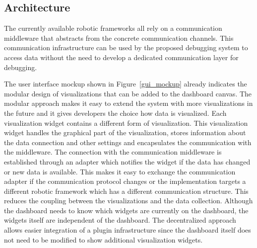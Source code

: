 \subsection{Architecture}
The currently available robotic frameworks all rely on a communication middleware that abstracts from the concrete communication channels. This communication infrastructure can be used by the proposed debugging system to access data without the need to develop a dedicated communication layer for debugging.

The user interface mockup shown in Figure~\ref{gui_mockup} already indicates the modular design of visualizations that can be added to the dashboard canvas. The modular approach makes it easy to extend the system with more visualizations in the future and it gives developers the choice how data is visualized. Each visualization widget contains a different form of visualization. This visualization widget handles the graphical part of the visualization, stores information about the data connection and other settings and encapsulates the communication with the middleware. The connection with the communication middleware is established through an adapter which notifies the widget if the data has changed or new data is available. This makes it easy to exchange the communication adapter if the communication protocol changes or the implementation targets a different robotic framework which has a different communication structure. This reduces the coupling between the visualizations and the data collection. Although the dashboard needs to know which widgets are currently on the dashboard, the widgets itself are independent of the dashboard. The decentralized approach allows easier integration of a plugin infrastructure since the dashboard itself does not need to be modified to show additional visualization widgets.



